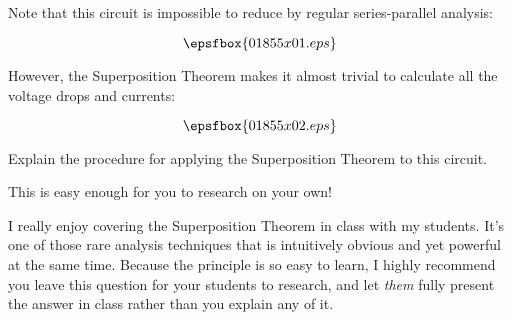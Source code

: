

Note that this circuit is impossible to reduce by regular series-parallel analysis:

$$\epsfbox{01855x01.eps}$$

However, the Superposition Theorem makes it almost trivial to calculate all the voltage drops and currents:

$$\epsfbox{01855x02.eps}$$

Explain the procedure for applying the Superposition Theorem to this circuit.







This is easy enough for you to research on your own!







I really enjoy covering the Superposition Theorem in class with my students.  It's one of those rare analysis techniques that is intuitively obvious and yet powerful at the same time.  Because the principle is so easy to learn, I highly recommend you leave this question for your students to research, and let {\it them} fully present the answer in class rather than you explain any of it.




